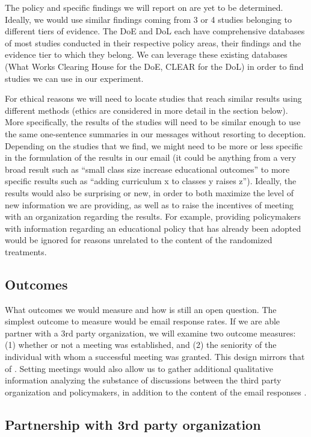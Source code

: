 \documentclass[12pt,final,fleqn]{article}
\theoremstyle{plain}
\begin{document}
The policy and specific findings we will report on are yet to be determined. Ideally, we would use similar findings coming from 3 or 4 studies belonging to different tiers of evidence. The DoE and DoL each have comprehensive databases of most studies conducted in their respective policy areas, their findings and the evidence tier to which they belong. We can leverage these existing databases (What Works Clearing House for the DoE, CLEAR for the DoL) in order to find studies we can use in our experiment. 

For ethical reasons we will need to locate studies that reach similar results using different methods (ethics are considered in more detail in the  section below). More specifically, the results of the studies will need to be similar enough to use the same one-sentence summaries in our messages without resorting to deception. Depending on the studies that we find, we might need to be more or less specific in the formulation of the results in our email (it could be anything from a very broad result such as ``small class size increase educational outcomes'' to more specific results such as ``adding curriculum x to classes y raises z''). Ideally, the results would also be surprising or new, in order to both maximize the level of new information we are providing, as well as to raise the incentives of meeting with an organization regarding the results. For example, providing policymakers with information regarding an educational policy that has already been adopted would be ignored for reasons unrelated to the content of the randomized treatments. 

\subsection{Outcomes} \label{sec: Outcomes}
What outcomes we would measure and how is still an open question. The simplest outcome to measure would be email response rates. If we are able partner with a 3rd party organization, we will examine two outcome measures: (1) whether or not a meeting was established, and (2) the seniority of the individual with whom a successful meeting was granted. This design mirrors that of \citet{kalla2016campaign}. Setting meetings would also allow us to gather additional qualitative information analyzing the substance of discussions between the third party organization and policymakers, in addition to the content of the email responses .

\subsection{Partnership with 3rd party organization} \label{sec: Partnership}
\end{document}
